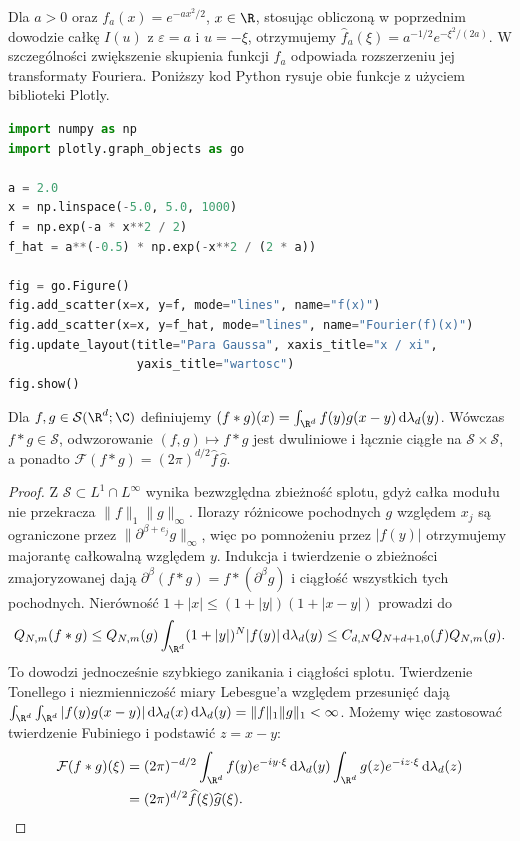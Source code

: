 \begin{przyklad}
\label{ex:fourier-gauss17}
Dla $a>0$ oraz $f_a(x)=e^{-ax^2/2}$, $x\in\R$,
stosując obliczoną w poprzednim dowodzie całkę $I(u)$
z $\varepsilon=a$ i $u=-\xi$, otrzymujemy
$\widehat f_a(\xi)=a^{-1/2}e^{-\xi^2/(2a)}$.
W szczególności zwiększenie skupienia funkcji $f_a$
odpowiada rozszerzeniu jej transformaty Fouriera.
Poniższy kod Python rysuje obie funkcje z użyciem biblioteki Plotly.
\begin{lstlisting}[language=Python,caption={Para funkcji Gaussa: funkcja i transformata Fouriera}]
import numpy as np
import plotly.graph_objects as go

a = 2.0
x = np.linspace(-5.0, 5.0, 1000)
f = np.exp(-a * x**2 / 2)
f_hat = a**(-0.5) * np.exp(-x**2 / (2 * a))

fig = go.Figure()
fig.add_scatter(x=x, y=f, mode="lines", name="f(x)")
fig.add_scatter(x=x, y=f_hat, mode="lines", name="Fourier(f)(x)")
fig.update_layout(title="Para Gaussa", xaxis_title="x / xi",
                  yaxis_title="wartosc")
fig.show()
\end{lstlisting}
\end{przyklad}

\begin{stwierdzenie}
\label{prop:convolution-schwartz17}
Dla $f,g\in\mathcal S(\R^d;\C)$ definiujemy
$(f*g)(x)=\int_{\R^d}f(y)g(x-y)\,\mathrm d\lambda_d(y)$.
Wówczas $f*g\in\mathcal S$, odwzorowanie
$(f,g)\mapsto f*g$ jest dwuliniowe i łącznie ciągłe
na $\mathcal S\times\mathcal S$, a ponadto
$\mathcal F(f*g)=(2\pi)^{d/2}\widehat f\,\widehat g$.
\end{stwierdzenie}
\begin{proof}
Z $\mathcal S\subset L^1\cap L^\infty$ wynika
bezwzględna zbieżność splotu, gdyż całka modułu
nie przekracza $\|f\|_1\|g\|_\infty$.
Ilorazy różnicowe pochodnych $g$ względem $x_j$
są ograniczone przez $\|\partial^{\beta+e_j}g\|_\infty$,
więc po pomnożeniu przez $|f(y)|$ otrzymujemy majorantę
całkowalną względem $y$. Indukcja i twierdzenie o zbieżności
zmajoryzowanej dają $\partial^\beta(f*g)=f*(\partial^\beta g)$
i ciągłość wszystkich tych pochodnych.
Nierówność $1+|x|\le(1+|y|)(1+|x-y|)$ prowadzi do
\[
 Q_{N,m}(f*g)\le Q_{N,m}(g)
 \int_{\R^d}(1+|y|)^N|f(y)|\,\mathrm d\lambda_d(y)
 \le C_{d,N}Q_{N+d+1,0}(f)Q_{N,m}(g).
\]
To dowodzi jednocześnie szybkiego zanikania i ciągłości
splotu. Twierdzenie Tonellego i niezmienniczość miary Lebesgue'a
względem przesunięć dają
$\int_{\R^d}\int_{\R^d}|f(y)g(x-y)|\,\mathrm d\lambda_d(x)
\,\mathrm d\lambda_d(y)=\|f\|_1\|g\|_1<\infty$.
Możemy więc zastosować twierdzenie Fubiniego i podstawić $z=x-y$:
\[
\begin{aligned}
\mathcal F(f*g)(\xi)
&=(2\pi)^{-d/2}
\int_{\R^d} f(y)e^{-iy\cdot\xi}\,\mathrm d\lambda_d(y)
\int_{\R^d}g(z)e^{-iz\cdot\xi}\,\mathrm d\lambda_d(z)\\
&=(2\pi)^{d/2}\widehat f(\xi)\widehat g(\xi).
\end{aligned}
\]
\end{proof}

